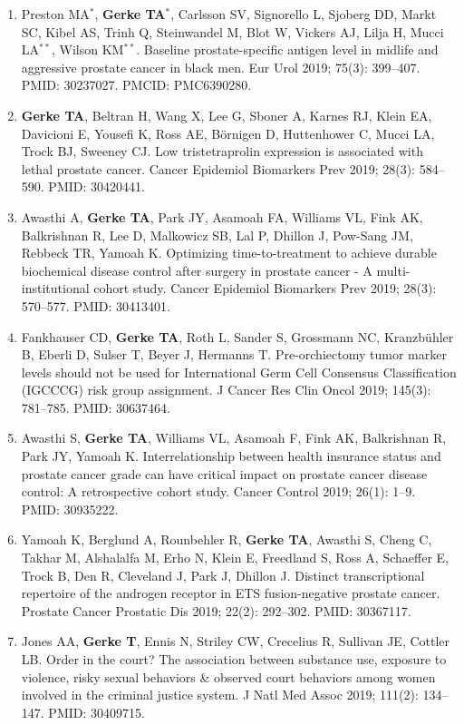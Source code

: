 \documentclass[11pt, a4paper]{article} %
\begin{document}
\begin{enumerate}[leftmargin=*]
\item{} Preston MA$^*$, {\bf Gerke TA$^*$}, Carlsson SV, Signorello L, Sjoberg DD, Markt SC, Kibel AS, Trinh Q, Steinwandel M, Blot W, Vickers AJ, Lilja H, Mucci LA$^{**}$, Wilson KM$^{**}$. Baseline prostate-specific antigen level in midlife and aggressive prostate cancer in black men. Eur Urol 2019; 75(3): 399--407. PMID: 30237027. PMCID: PMC6390280.

\item{} {\bf Gerke TA}, Beltran H, Wang X, Lee G, Sboner A, Karnes RJ, Klein EA, Davicioni E, Yousefi K, Ross AE, B\"{o}rnigen D, Huttenhower C, Mucci LA, Trock BJ, Sweeney CJ. Low tristetraprolin expression is associated with lethal prostate cancer. Cancer Epidemiol Biomarkers Prev 2019; 28(3): 584--590. PMID: 30420441. 

\item{} Awasthi A, {\bf Gerke TA}, Park JY, Asamoah FA, Williams VL, Fink AK, Balkrishnan R, Lee D, Malkowicz SB, Lal P, Dhillon J, Pow-Sang JM, Rebbeck TR, Yamoah K. Optimizing time-to-treatment to achieve durable biochemical disease control after surgery in prostate cancer - A multi-institutional cohort study. Cancer Epidemiol Biomarkers Prev 2019; 28(3): 570--577. PMID: 30413401. 

\item{} Fankhauser CD, {\bf Gerke TA}, Roth L, Sander S, Grossmann NC, Kranzb{\"u}hler B, Eberli D, Sulser T, Beyer J, Hermanns T. Pre-orchiectomy tumor marker levels should not be used for International Germ Cell Consensus Classification (IGCCCG) risk group assignment. J Cancer Res Clin Oncol 2019; 145(3): 781--785. PMID: 30637464. 

\item{} Awasthi S,  {\bf Gerke TA}, Williams VL, Asamoah F, Fink AK, Balkrishnan R, Park JY, Yamoah K. Interrelationship between health insurance status and prostate cancer grade can have critical impact on prostate cancer disease control: A retrospective cohort study. Cancer Control 2019; 26(1): 1--9. PMID: 30935222. 

\item{} Yamoah K, Berglund A, Rounbehler R, {\bf Gerke TA}, Awasthi S, Cheng C, Takhar M, Alshalalfa M, Erho N, Klein E, Freedland S, Ross A, Schaeffer E, Trock B, Den R, Cleveland J, Park J, Dhillon J. Distinct transcriptional repertoire of the androgen receptor in ETS fusion-negative prostate cancer. Prostate Cancer Prostatic Dis 2019; 22(2): 292--302. PMID: 30367117.

\item{} Jones AA, {\bf Gerke T}, Ennis N, Striley CW, Crecelius R, Sullivan JE, Cottler LB. Order in the court? The association between substance use, exposure to violence, risky sexual behaviors \& observed court behaviors among women involved in the criminal justice system. J Natl Med Assoc 2019; 111(2): 134--147. PMID: 30409715. 


\end{enumerate}
\end{document}
